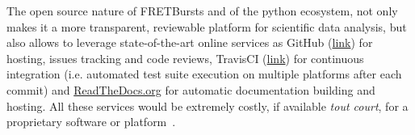 The open source nature of FRETBursts and of the python ecosystem,
not only makes it a more transparent, reviewable platform
for scientific data analysis, but also allows
to leverage state-of-the-art online services as GitHub (\href{http://https://github.com}{link}) for hosting,
issues tracking and code reviews, TravisCI
(\href{https://travis-ci.org}{link}) for continuous integration
(i.e. automated test suite execution on multiple platforms after each commit)
and \href{https://readthedocs.org/}{ReadTheDocs.org} for automatic documentation building and hosting.
All these services would be extremely costly, if available \textit{tout court},
for a proprietary software or platform~\cite{Freeman_2015}.
